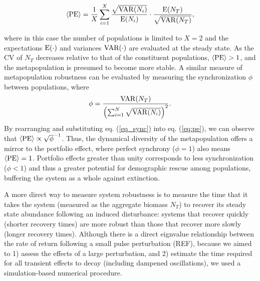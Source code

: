 \documentclass[twocolumn,preprintnumbers,amsmath,amssymb,superscriptaddress]{revtex4}
\begin{document}
\begin{equation}
\langle{\rm PE}\rangle =\frac{1}{X}\sum_{i=1}^{X} \frac{\sqrt{{\rm VAR}(N_i)}}{{\rm E}(N_i)}\cdot \frac{{\rm E}(N_T)}{\sqrt{{\rm VAR}(N_T)}},
\label{eq:pe}
\end{equation}

\noindent where in this case the number of populations is limited to $X=2$ and the expectations $\rm E(\cdot)$ and variances $\rm VAR(\cdot)$ are evaluated at the steady state.
As the CV of $N_T$ decreases relative to that of the constituent populations, $\langle{\rm PE}\rangle > 1$, and the metapopulation is presumed to become more stable.
{\color{red} A similar measure of metapopulation robustness can be evaluated by measuring the synchronization $\phi$ between populations, where 
\begin{equation}
\label{eq_sync}
\phi = \frac{{\rm VAR}(N_T)}{\left(\sum_{i=1}^N\sqrt{{\rm VAR}(N_i)}\right)^2}.
\end{equation}
By rearranging and substituting eq. (\ref{eq_sync}) into eq. (\ref{eq:pe}), we can observe that $\langle{\rm PE}\rangle \propto \sqrt{\phi}^{-1}$.
Thus, the dynamical diversity of the metapopulation offers a mirror to the portfolio effect, where perfect synchrony ($\phi = 1$) also means $\langle{\rm PE}\rangle = 1$.}
Portfolio effects greater than unity corresponds to less synchronization ($\phi < 1$) \cite{Loreau:2008ju,Anderson:2014cx,Yeakel:2013vz} and thus a greater potential for demographic rescue among populations, buffering the system as a whole against extinction. 

A more direct way to measure system robustness is to measure the time that it takes the system (measured as the aggregate biomass $N_T$) to recover its steady state abundance following an induced disturbance: systems that recover quickly (shorter recovery times) are more robust than those that recover more slowly (longer recovery times).
Although there is a direct eignvalue relationship between the rate of return following a small pulse perturbation (REF), because we aimed to 1) assess the effects of a large perturbation, and 2) estimate the time required for all transient effects to decay (including dampened oscillations), we used a simulation-based numerical procedure.
\end{document}
